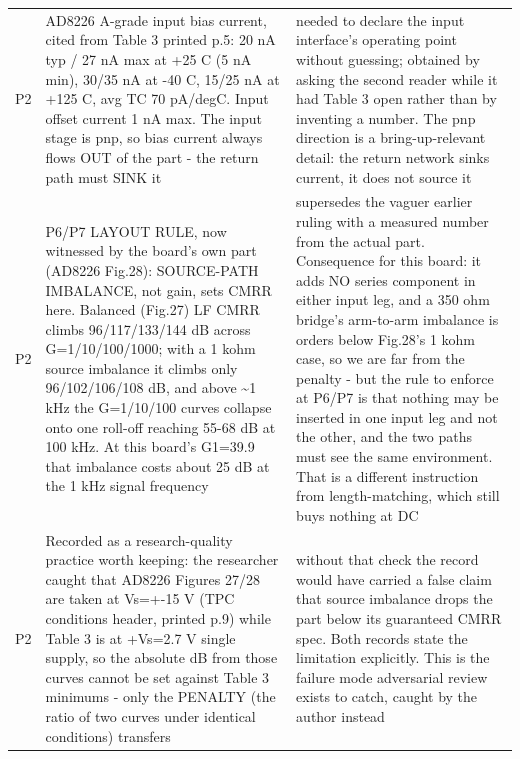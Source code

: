 \documentclass[11pt,a4paper]{article}
\begin{document}
{\begin{longtable}{lp{5.2cm}p{7.2cm}}
P2 & AD8226 A-grade input bias current, cited from Table 3 printed p.5: 20 nA typ / 27 nA max at +25 C (5 nA min), 30/35 nA at -40 C, 15/25 nA at +125 C, avg TC 70 pA/degC. Input offset current 1 nA max. The input stage is pnp, so bias current always flows OUT of the part - the return path must SINK it & needed to declare the input interface's operating point without guessing; obtained by asking the second reader while it had Table 3 open rather than by inventing a number. The pnp direction is a bring-up-relevant detail: the return network sinks current, it does not source it \\
P2 & P6/P7 LAYOUT RULE, now witnessed by the board's own part (AD8226 Fig.28): SOURCE-PATH IMBALANCE, not gain, sets CMRR here. Balanced (Fig.27) LF CMRR climbs 96/117/133/144 dB across G=1/10/100/1000; with a 1 kohm source imbalance it climbs only 96/102/106/108 dB, and above \textasciitilde{}1 kHz the G=1/10/100 curves collapse onto one roll-off reaching 55-68 dB at 100 kHz. At this board's G1=39.9 that imbalance costs about 25 dB at the 1 kHz signal frequency & supersedes the vaguer earlier ruling with a measured number from the actual part. Consequence for this board: it adds NO series component in either input leg, and a 350 ohm bridge's arm-to-arm imbalance is orders below Fig.28's 1 kohm case, so we are far from the penalty - but the rule to enforce at P6/P7 is that nothing may be inserted in one input leg and not the other, and the two paths must see the same environment. That is a different instruction from length-matching, which still buys nothing at DC \\
P2 & Recorded as a research-quality practice worth keeping: the researcher caught that AD8226 Figures 27/28 are taken at Vs=+-15 V (TPC conditions header, printed p.9) while Table 3 is at +Vs=2.7 V single supply, so the absolute dB from those curves cannot be set against Table 3 minimums - only the PENALTY (the ratio of two curves under identical conditions) transfers & without that check the record would have carried a false claim that source imbalance drops the part below its guaranteed CMRR spec. Both records state the limitation explicitly. This is the failure mode adversarial review exists to catch, caught by the author instead \\

\end{longtable}}
\end{document}
